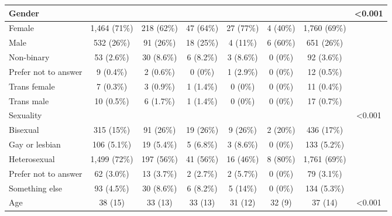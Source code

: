 \begin{tabular}{l|c|c|c|c|c|c|c}
\hline
Gender &  &  &  &  &  &  & <0.001\\
\hline
Female & 1,464 (71\%) & 218 (62\%) & 47 (64\%) & 27 (77\%) & 4 (40\%) & 1,760 (69\%) & \\
\hline
Male & 532 (26\%) & 91 (26\%) & 18 (25\%) & 4 (11\%) & 6 (60\%) & 651 (26\%) & \\
\hline
Non-binary & 53 (2.6\%) & 30 (8.6\%) & 6 (8.2\%) & 3 (8.6\%) & 0 (0\%) & 92 (3.6\%) & \\
\hline
Prefer not to answer & 9 (0.4\%) & 2 (0.6\%) & 0 (0\%) & 1 (2.9\%) & 0 (0\%) & 12 (0.5\%) & \\
\hline
Trans female & 7 (0.3\%) & 3 (0.9\%) & 1 (1.4\%) & 0 (0\%) & 0 (0\%) & 11 (0.4\%) & \\
\hline
Trans male & 10 (0.5\%) & 6 (1.7\%) & 1 (1.4\%) & 0 (0\%) & 0 (0\%) & 17 (0.7\%) & \\
\hline
Sexuality &  &  &  &  &  &  & <0.001\\
\hline
Bisexual & 315 (15\%) & 91 (26\%) & 19 (26\%) & 9 (26\%) & 2 (20\%) & 436 (17\%) & \\
\hline
Gay or lesbian & 106 (5.1\%) & 19 (5.4\%) & 5 (6.8\%) & 3 (8.6\%) & 0 (0\%) & 133 (5.2\%) & \\
\hline
Heterosexual & 1,499 (72\%) & 197 (56\%) & 41 (56\%) & 16 (46\%) & 8 (80\%) & 1,761 (69\%) & \\
\hline
Prefer not to answer & 62 (3.0\%) & 13 (3.7\%) & 2 (2.7\%) & 2 (5.7\%) & 0 (0\%) & 79 (3.1\%) & \\
\hline
Something else & 93 (4.5\%) & 30 (8.6\%) & 6 (8.2\%) & 5 (14\%) & 0 (0\%) & 134 (5.3\%) & \\
\hline
Age & 38 (15) & 33 (13) & 33 (13) & 31 (12) & 32 (9) & 37 (14) & <0.001\\
\hline
\end{tabular}